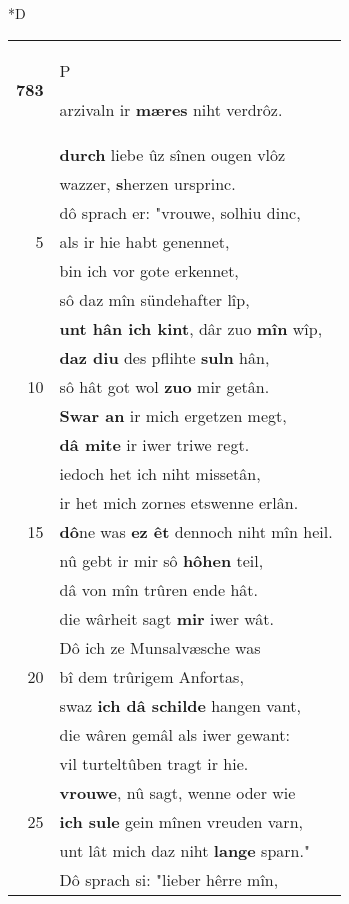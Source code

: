 \documentclass[8pt,a4paper,notitlepage]{article}
\begin{document}
\begin{table}[ht]
\begin{minipage}[t]{0.5\linewidth}
\small
\begin{center}*D
\end{center}
\begin{tabular}{rl}
\textbf{783} & \begin{large}P\end{large}arzivaln ir \textbf{mæres} niht verdrôz.\\ 
 & \textbf{durch} liebe ûz sînen ougen vlôz\\ 
 & wazzer, \textbf{s}herzen ursprinc.\\ 
 & dô sprach er: "vrouwe, solhiu dinc,\\ 
5 & als ir hie habt genennet,\\ 
 & bin ich vor gote erkennet,\\ 
 & sô daz mîn sündehafter lîp,\\ 
 & \textbf{unt hân ich kint}, dâr zuo \textbf{mîn} wîp,\\ 
 & \textbf{daz diu} des pflihte \textbf{suln} hân,\\ 
10 & sô hât got wol \textbf{zuo} mir getân.\\ 
 & \textbf{Swar an} ir mich ergetzen megt,\\ 
 & \textbf{dâ mite} ir iwer triwe regt.\\ 
 & iedoch het ich niht missetân,\\ 
 & ir het mich zornes etswenne erlân.\\ 
15 & \textbf{dô}ne was \textbf{ez êt} dennoch niht mîn heil.\\ 
 & nû gebt ir mir sô \textbf{hôhen} teil,\\ 
 & dâ von mîn trûren ende hât.\\ 
 & die wârheit sagt \textbf{mir} iwer wât.\\ 
 & Dô ich ze Munsalvæsche was\\ 
20 & bî dem trûrigem Anfortas,\\ 
 & swaz \textbf{ich dâ schilde} hangen vant,\\ 
 & die wâren gemâl als iwer gewant:\\ 
 & vil turteltûben tragt ir hie.\\ 
 & \textbf{vrouwe}, nû sagt, wenne oder wie\\ 
25 & \textbf{ich sule} gein mînen vreuden varn,\\ 
 & unt lât mich daz niht \textbf{lange} sparn."\\ 
 & Dô sprach si: "lieber hêrre mîn,\\ 

\end{tabular}
\end{minipage}
\end{table}
\end{document}
